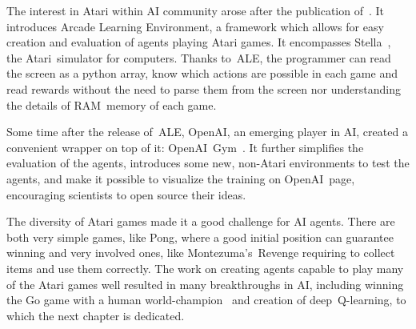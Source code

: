 The interest in Atari within AI community arose after the publication of~\cite{ale}. It introduces Arcade Learning Environment, a framework which allows for easy creation and evaluation of agents playing Atari games. It encompasses Stella~\cite{stella}, the Atari~simulator for computers. Thanks to~ALE, the programmer can read the screen as a python array, know which actions are possible in each game and read rewards without the need to parse them from the screen nor understanding the details of RAM~memory of each game.

Some time after the release of~ALE, OpenAI, an emerging player in AI, created a convenient wrapper on top of it: OpenAI~Gym~\cite{gym}. It further simplifies the evaluation of the agents, introduces some new, non-Atari environments to test the agents, and make it possible to visualize the training on OpenAI~page, encouraging scientists to open source their ideas.

The diversity of Atari games made it a good challenge for AI agents. There are both very simple games, like Pong, where a good initial position can guarantee winning and very involved ones, like Montezuma's~Revenge  requiring to collect items and use them correctly. The work on creating agents capable to play many of the Atari games well resulted in many breakthroughs in AI, including winning the Go game with a human world-champion~\cite{alphago} and creation of deep~Q-learning, to which the next chapter is dedicated.

